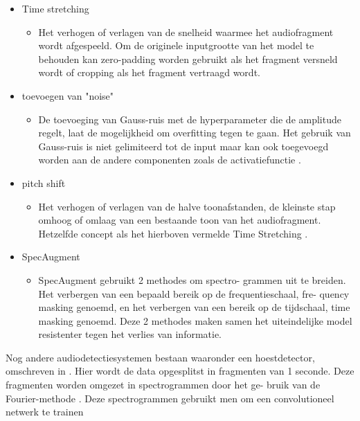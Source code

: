 \documentclass{hogent-article}
\begin{document}
\begin{itemize}

	
	\item Time stretching \autocite{Wei_2020}
	\bigbreak 
	\begin{itemize}
		\item Het verhogen of verlagen van de snelheid waarmee het audiofragment wordt afgespeeld. Om de originele inputgrootte van het model te behouden kan zero-padding worden gebruikt als het fragment versneld wordt of cropping als het fragment vertraagd wordt.
		 
	\end{itemize}
	\bigbreak
	\item toevoegen van "noise" \autocite{Wei_2020}
	\bigbreak
	\begin{itemize}
		\item De toevoeging van Gauss-ruis met de hyperparameter die de amplitude regelt, laat de mogelijkheid om overﬁtting tegen te gaan. Het gebruik van Gauss-ruis is niet gelimiteerd tot de input maar kan ook toegevoegd worden aan de andere componenten zoals de activatiefunctie .
	\end{itemize}
	\bigbreak
	\item pitch shift \autocite{Wei_2020}
	\bigbreak 
	\begin{itemize}
		\item Het verhogen of verlagen van de halve toonafstanden, de kleinste stap omhoog of omlaag van een bestaande toon van het audiofragment.  Hetzelfde concept als het hierboven vermelde Time Stretching .
			
	\end{itemize}
	\bigbreak

	\item SpecAugment \autocite{Park_2019}
	\bigbreak
	\begin{itemize}
		\item SpecAugment gebruikt 2 methodes om spectro- grammen uit te breiden.  Het verbergen van een bepaald bereik op de frequentieschaal, fre- quency masking genoemd, en het verbergen van een bereik op de tijdschaal, time masking genoemd.
		Deze 2 methodes maken samen het uiteindelijke model  resistenter tegen het verlies van informatie. 
		
		
		
	\end{itemize}
\end{itemize}
\bigbreak
Nog andere audiodetectiesystemen bestaan waaronder een  hoestdetector, omschreven in \cite{Kvapilova_2019}.  Hier wordt de  data opgesplitst in fragmenten van 1 seconde. Deze fragmenten worden omgezet in spectrogrammen door het ge- bruik van de Fourier-methode . Deze spectrogrammen  gebruikt men om een convolutioneel netwerk te trainen 
\end{document}
